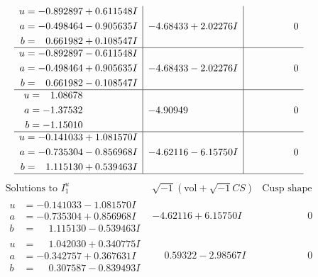 \documentclass[1p]{elsarticle_modified}
\theoremstyle{definition}
\newcommand{\I}{\sqrt{-1}}
\begin{document}
$$\begin{array}{c|c|c}
\begin{aligned}
u &= -0.892897 + 0.611548 I \\
a &= -0.498464 - 0.905635 I \\
b &= \phantom{-}0.661982 + 0.108547 I\end{aligned}
 & -4.68433 + 2.02276 I & \phantom{-0.000000 } 0 \\ \hline\begin{aligned}
u &= -0.892897 - 0.611548 I \\
a &= -0.498464 + 0.905635 I \\
b &= \phantom{-}0.661982 - 0.108547 I\end{aligned}
 & -4.68433 - 2.02276 I & \phantom{-0.000000 } 0 \\ \hline\begin{aligned}
u &= \phantom{-}1.08678\phantom{ +0.000000I} \\
a &= -1.37532\phantom{ +0.000000I} \\
b &= -1.15010\phantom{ +0.000000I}\end{aligned}
 & -4.90949\phantom{ +0.000000I} & \phantom{-0.000000 } 0 \\ \hline\begin{aligned}
u &= -0.141033 + 1.081570 I \\
a &= -0.735304 - 0.856968 I \\
b &= \phantom{-}1.115130 + 0.539463 I\end{aligned}
 & -4.62116 - 6.15750 I & \phantom{-0.000000 } 0\\
 \hline 
 \end{array}$$\newpage$$\begin{array}{c|c|c}  
\text{Solutions to }I^u_{1}& \I (\text{vol} + \sqrt{-1}CS) & \text{Cusp shape}\\
 \hline 
\begin{aligned}
u &= -0.141033 - 1.081570 I \\
a &= -0.735304 + 0.856968 I \\
b &= \phantom{-}1.115130 - 0.539463 I\end{aligned}
 & -4.62116 + 6.15750 I & \phantom{-0.000000 } 0 \\ \hline\begin{aligned}
u &= \phantom{-}1.042030 + 0.340775 I \\
a &= -0.342757 + 0.367631 I \\
b &= \phantom{-}0.307587 - 0.839493 I\end{aligned}
 & \phantom{-}0.59322 - 2.98567 I & \phantom{-0.000000 } 0 \\ \hline\begin{aligned}

\end{aligned}
\end{array}$$
\end{document}
